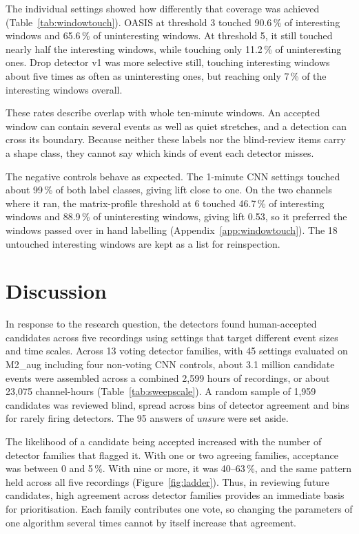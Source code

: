 The individual settings showed how differently that coverage was achieved (Table~\ref{tab:windowtouch}). OASIS at threshold 3 touched 90.6\,\% of interesting windows and 65.6\,\% of uninteresting windows. At threshold 5, it still touched nearly half the interesting windows, while touching only 11.2\,\% of uninteresting ones. Drop detector v1 was more selective still, touching interesting windows about five times as often as uninteresting ones, but reaching only 7\,\% of the interesting windows overall.

These rates describe overlap with whole ten-minute windows. An accepted window can contain several events as well as quiet stretches, and a detection can cross its boundary. Because neither these labels nor the blind-review items carry a shape class, they cannot say which kinds of event each detector misses.

The negative controls behave as expected. The 1-minute CNN settings touched about 99\,\% of both label classes, giving lift close to one. On the two channels where it ran, the matrix-profile threshold at 6 touched 46.7\,\% of interesting windows and 88.9\,\% of uninteresting windows, giving lift 0.53, so it preferred the windows passed over in hand labelling (Appendix~\ref{app:windowtouch}). The 18 untouched interesting windows are kept as a list for reinspection.


\section{Discussion}

In response to the research question, the detectors found human-accepted candidates across five recordings using settings that target different event sizes and time scales. Across 13 voting detector families, with 45 settings evaluated on M2\_aug including four non-voting CNN controls, about 3.1 million candidate events were assembled across a combined 2,599 hours of recordings, or about 23,075 channel-hours (Table~\ref{tab:sweepscale}). A random sample of 1,959 candidates was reviewed blind, spread across bins of detector agreement and bins for rarely firing detectors. The 95 answers of \emph{unsure} were set aside.

The likelihood of a candidate being accepted increased with the number of detector families that flagged it. With one or two agreeing families, acceptance was between 0 and 5\,\%. With nine or more, it was 40--63\,\%, and the same pattern held across all five recordings (Figure~\ref{fig:ladder}). Thus, in reviewing future candidates, high agreement across detector families provides an immediate basis for prioritisation. Each family contributes one vote, so changing the parameters of one algorithm several times cannot by itself increase that agreement.

